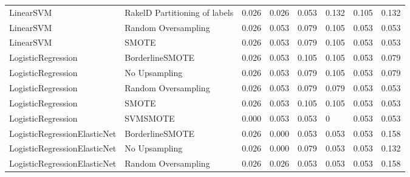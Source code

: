 \begin{tabular}{llllllll}
                      LinearSVM & RakelD Partitioning of labels & 0.026 &                     0.026 &                 0.053 &                  0.132 &                                   0.105 &    0.132 \\
                      LinearSVM &           Random Oversampling & 0.026 &                     0.053 &                 0.079 &                  0.105 &                                   0.053 &    0.053 \\
                      LinearSVM &                         SMOTE & 0.026 &                     0.053 &                 0.079 &                  0.105 &                                   0.053 &    0.053 \\
             LogisticRegression &               BorderlineSMOTE & 0.026 &                     0.053 &                 0.105 &                  0.105 &                                   0.053 &    0.079 \\
             LogisticRegression &                 No Upsampling & 0.026 &                     0.053 &                 0.079 &                  0.105 &                                   0.053 &    0.079 \\
             LogisticRegression &           Random Oversampling & 0.026 &                     0.053 &                 0.079 &                  0.079 &                                   0.053 &    0.053 \\
             LogisticRegression &                         SMOTE & 0.026 &                     0.053 &                 0.105 &                  0.105 &                                   0.053 &    0.053 \\
             LogisticRegression &                      SVMSMOTE & 0.000 &                     0.053 &                 0.053 &                      0 &                                   0.053 &    0.053 \\
   LogisticRegressionElasticNet &               BorderlineSMOTE & 0.026 &                     0.000 &                 0.053 &                  0.053 &                                   0.053 &    0.158 \\
   LogisticRegressionElasticNet &                 No Upsampling & 0.026 &                     0.000 &                 0.079 &                  0.053 &                                   0.053 &    0.132 \\
   LogisticRegressionElasticNet &           Random Oversampling & 0.026 &                     0.026 &                 0.053 &                  0.053 &                                   0.053 &    0.158 \\

\end{tabular}

